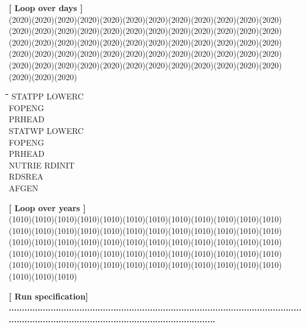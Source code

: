 \strut\hfill {\bf [ Loop over days ]}\\
 \GrBox(2020)\GrBox(2020)\GrBox(2020)\GrBox(2020)\GrBox(2020)\GrBox(2020)\GrBox(2020)\GrBox(2020)\GrBox(2020)\GrBox(2020)\GrBox(2020)\GrBox(2020)\GrBox(2020)\GrBox(2020)\GrBox(2020)\GrBox(2020)\GrBox(2020)\GrBox(2020)\GrBox(2020)\GrBox(2020)\GrBox(2020)\GrBox(2020)\GrBox(2020)\GrBox(2020)\GrBox(2020)\GrBox(2020)\GrBox(2020)\GrBox(2020)\GrBox(2020)\GrBox(2020)\GrBox(2020)\GrBox(2020)\GrBox(2020)\GrBox(2020)\GrBox(2020)\GrBox(2020)\GrBox(2020)\GrBox(2020)\GrBox(2020)\GrBox(2020)\GrBox(2020)\GrBox(2020)\GrBox(2020)\GrBox(2020)\GrBox(2020)\GrBox(2020)\GrBox(2020)\GrBox(2020)\GrBox(2020)\GrBox(2020)\GrBox(2020)\GrBox(2020)\GrBox(2020)\GrBox(2020)\GrBox(2020)\GrBox(2020)\GrBox(2020)\GrBox(2020)\GrBox(2020)\GrBox(2020)\GrBox(2020)\GrBox(2020)\GrBox(2020)\nwln
\begin{tabbing}
\hspace{1.27cm}\=\hspace{1.27cm}\=\hspace{1.27cm}\=\hspace{1.27cm}\=%
\hspace{1.27cm}\=\hspace{1.27cm}\=\hspace{1.27cm}\=\hspace{1.27cm}\=%
\hspace{1.27cm}\=\hspace{1.27cm}\=\kill
\>\> \> \> STATPP\> \> LOWERC\\
\>\> \> \> \> \> FOPENG\\
\>\> \> \> \> \> PRHEAD\\
\>\> \> \> STATWP\> \> LOWERC\\
\>\> \> \> \> \> FOPENG\\
\>\> \> \> \> \> PRHEAD\\
\>\> \> \> NUTRIE\> \> RDINIT\\
\>\> \> \> \> \> RDSREA\\
\>\> \> \> \> \> AFGEN
\end{tabbing}
\strut\hfill {\bf [ Loop over years ]}\\
 \GrBox(1010)\GrBox(1010)\GrBox(1010)\GrBox(1010)\GrBox(1010)\GrBox(1010)\GrBox(1010)\GrBox(1010)\GrBox(1010)\GrBox(1010)\GrBox(1010)\GrBox(1010)\GrBox(1010)\GrBox(1010)\GrBox(1010)\GrBox(1010)\GrBox(1010)\GrBox(1010)\GrBox(1010)\GrBox(1010)\GrBox(1010)\GrBox(1010)\GrBox(1010)\GrBox(1010)\GrBox(1010)\GrBox(1010)\GrBox(1010)\GrBox(1010)\GrBox(1010)\GrBox(1010)\GrBox(1010)\GrBox(1010)\GrBox(1010)\GrBox(1010)\GrBox(1010)\GrBox(1010)\GrBox(1010)\GrBox(1010)\GrBox(1010)\GrBox(1010)\GrBox(1010)\GrBox(1010)\GrBox(1010)\GrBox(1010)\GrBox(1010)\GrBox(1010)\GrBox(1010)\GrBox(1010)\GrBox(1010)\GrBox(1010)\GrBox(1010)\GrBox(1010)\GrBox(1010)\GrBox(1010)\GrBox(1010)\GrBox(1010)\GrBox(1010)\GrBox(1010)\GrBox(1010)\GrBox(1010)\GrBox(1010)\GrBox(1010)\GrBox(1010)\\
\strut\hfill {\bf [ Run specification]}\\
{\bf ...............................................................................................................................................................................................\-}

